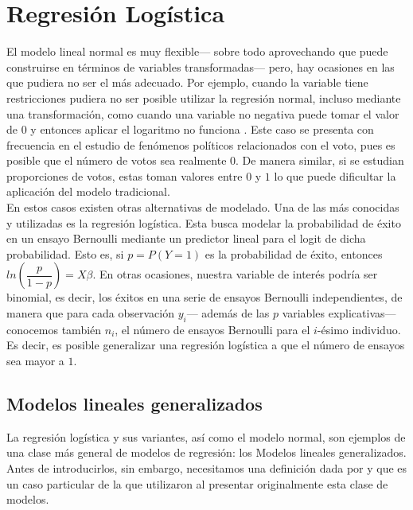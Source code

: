 \section{Regresión Logística}

El modelo lineal normal es muy flexible--- sobre todo aprovechando que puede construirse en términos de variables transformadas--- pero, hay ocasiones en las que pudiera no ser el más adecuado. Por ejemplo, cuando la variable tiene restricciones pudiera no ser posible utilizar la regresión normal, incluso mediante una transformación, como cuando una variable no negativa puede tomar el valor de $0$ y entonces aplicar el logaritmo no funciona \parencite[405]{Gelman13}. Este caso se presenta con frecuencia en el estudio de fenómenos políticos relacionados con el voto, pues es posible que el número de votos sea realmente $0$. De manera similar, si se estudian proporciones de votos, estas toman valores entre $0$ y $1$ lo que puede dificultar la aplicación del modelo tradicional.\\ 


En estos casos existen otras alternativas de modelado. Una de las más conocidas y utilizadas es la regresión logística. Esta busca modelar la probabilidad de éxito en un ensayo Bernoulli mediante un predictor lineal para el logit de dicha probabilidad. Esto es, si $p = P(Y=1)$ es la probabilidad de éxito, entonces $ln\left(\dfrac{p}{1-p}\right)=X\beta$. En otras ocasiones, nuestra variable de interés podría ser binomial, es decir, los éxitos en una serie de ensayos Bernoulli independientes, de manera que para cada observación $y_i$--- además de las $p$ variables explicativas--- conocemos también $n_i$, el número de ensayos Bernoulli para el $i$-ésimo individuo. Es decir, es posible generalizar una regresión logística a que el número de ensayos sea mayor a $1$.\\ 

\subsection{Modelos lineales generalizados}

La regresión logística y sus variantes, así como el modelo normal, son  ejemplos de una clase más general de modelos de regresión: los Modelos lineales generalizados. Antes de introducirlos, sin embargo, necesitamos una definición dada por \textcite[51]{Nieto16} y que es un caso particular de la que utilizaron \textcite[371]{NelderWedderburn72} al presentar originalmente esta clase de modelos. 

